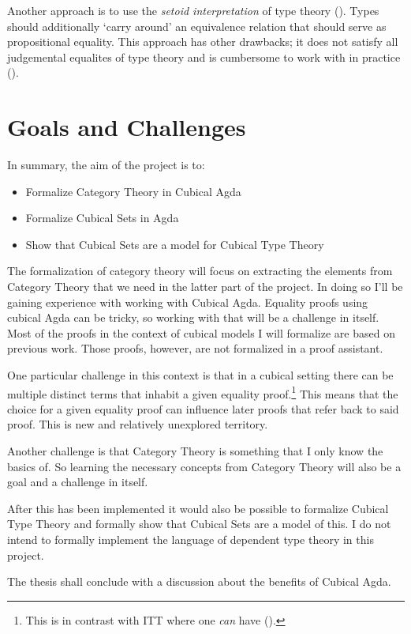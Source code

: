Another approach is to use the \emph{setoid interpretation} of type theory
(\cite{hofmann-1995,huber-2016}). Types should additionally `carry around' an
equivalence relation that should serve as propositional equality. This approach
has other drawbacks; it does not satisfy all judgemental equalites of type
theory and is cumbersome to work with in practice (\cite[p. 4]{huber-2016}).
%
\section{Goals and Challenges}
%
In summary, the aim of the project is to:
%
\begin{itemize}
\item
Formalize Category Theory in Cubical Agda
\item
Formalize Cubical Sets in Agda
\item
Show that Cubical Sets are a model for Cubical Type Theory
\end{itemize}
%
The formalization of category theory will focus on extracting the elements from
Category Theory that we need in the latter part of the project. In doing so I'll
be gaining experience with working with Cubical Agda. Equality proofs using
cubical Agda can be tricky, so working with that will be a challenge in itself.
Most of the proofs in the context of cubical models I will formalize are based
on previous work. Those proofs, however, are not formalized in a proof
assistant.

One particular challenge in this context is that in a cubical setting there can
be multiple distinct terms that inhabit a given equality proof.\footnote{This is
in contrast with ITT where one \emph{can} have 
(\cite[p. 4]{huber-2016}).} This means that the choice for a given equality
proof can influence later proofs that refer back to said proof. This is new and
relatively unexplored territory.

Another challenge is that Category Theory is something that I only know the
basics of. So learning the necessary concepts from Category Theory will also be
a goal and a challenge in itself.

After this has been implemented it would also be possible to formalize Cubical
Type Theory and formally show that Cubical Sets are a model of this. I do not
intend to formally implement the language of dependent type theory in this
project.

The thesis shall conclude with a discussion about the benefits of Cubical Agda.
